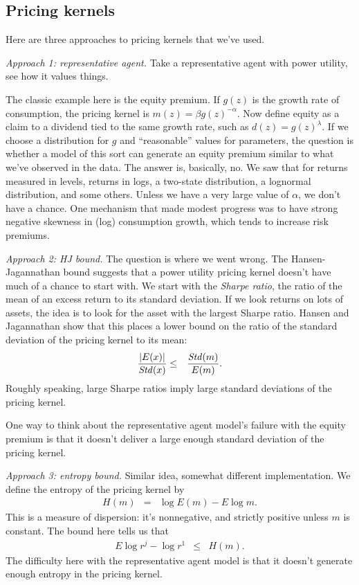 \documentclass[11pt]{article}
\begin{document}
\subsection*{Pricing kernels}

Here are three approaches to pricing kernels that we've used.  

{\it Approach 1:  representative agent.\/}  
Take a representative agent with power utility,
see how it values things.  

The classic example here is the equity premium.  
If $g(z)$ is the growth rate of consumption, the pricing kernel is 
$ m(z) = \beta g(z)^{-\alpha}$.  
Now define equity as a claim to a dividend tied to the same growth rate,
such as $ d(z) = g(z)^\lambda$.  
If we choose a distribution for $g$ and ``reasonable'' values for  parameters, 
the question is whether a model of this sort can generate an equity premium similar 
to what we've observed in the data.  
The answer is, basically, no.  
We saw that for returns measured in levels, returns in logs, 
a two-state distribution, a lognormal distribution, and some others.  
Unless we have a very large value of $\alpha$, we don't have a chance.  
One mechanism that made modest progress was to have strong negative skewness
in (log) consumption growth, which tends to increase risk premiums.  


{\it Approach 2: HJ bound.\/}
The question is where we went wrong.  
The Hansen-Jagannathan bound suggests that a power utility pricing kernel 
doesn't have much of a chance to start with.  
We start with the {\it Sharpe ratio\/}, the ratio of the mean of an excess return 
to its standard deviation.  
If we look returns on lots of assets, the idea is to look for the asset
with the largest Sharpe ratio.  
Hansen and Jagannathan show that this places a lower bound on 
the ratio of the standard deviation of the pricing kernel to its mean:  
\begin{eqnarray*}
  \frac{| E(x)|}{ \mbox{\it Std\/}(x)} &\leq& \frac{ \mbox{\it Std\/}(m)}{E(m)} .
\end{eqnarray*}
Roughly speaking, large Sharpe ratios imply large standard deviations of the pricing kernel.

One way to think about the representative agent model's failure with the equity premium 
is that it doesn't deliver a large enough standard deviation of
the pricing kernel.  


{\it Approach 3: entropy bound.\/}
Similar idea, somewhat different implementation.
We define the entropy of the pricing kernel by 
\begin{eqnarray*}
    H(m) &=& \log E(m) - E \log m .
\end{eqnarray*}
This is a measure of dispersion:  
it's nonnegative, and strictly positive unless $m$ is constant.  
The bound here tells us that 
\begin{eqnarray*}
    E  \log r^j - \log r^1  &\leq&  H(m) .
\end{eqnarray*}
The difficulty here with the representative agent model is 
that it doesn't generate enough entropy in the pricing kernel.  
\end{document}
